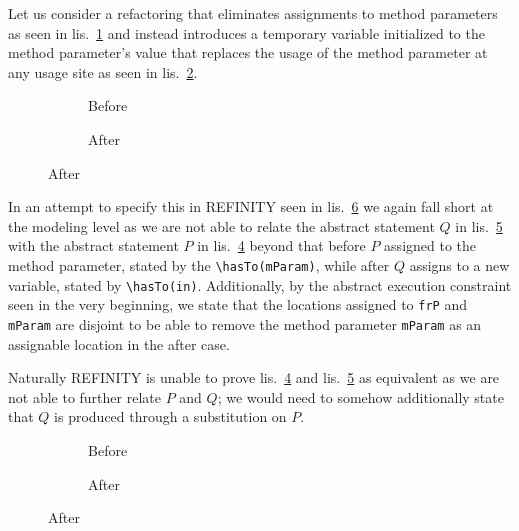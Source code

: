 Let us consider a refactoring that eliminates assignments to method parameters as seen in lis.~\ref{lst:RemoveAssignment-java-before} and instead introduces a temporary variable initialized to the method parameter's value that replaces the usage of the method parameter at any usage site as seen in lis.~\ref{lst:RemoveAssignment-java-after}.

\begin{figure}
  \begin{subfigure}{.45\linewidth}
    
    \caption{Before}
    \label{lst:RemoveAssignment-java-before}
  \end{subfigure}\hspace{1cm}
  \begin{subfigure}{.45\linewidth}
    
    \caption{After}
    \label{lst:RemoveAssignment-java-after}
  \end{subfigure}
  \label{lst:RemovAssignment-java}
\end{figure}

In an attempt to specify this in REFINITY seen in lis.~\ref{lst:RemovAssignment-refinity} we again fall short at the modeling level as we are not able to relate the abstract statement $Q$ in lis.~\ref{lst:RemoveAssignment-refinity-after} with the abstract statement $P$ in lis.~\ref{lst:RemoveAssignment-refinity-before} beyond that before $P$ assigned to the method parameter, stated by the \lstinline[style=refinity]|\hasTo(mParam)|, while after $Q$ assigns to a new variable, stated by \lstinline[style=refinity]|\hasTo(in)|. Additionally, by the abstract execution constraint seen in the very beginning, we state that the locations
assigned to \lstinline[style=refinity]|frP| and \lstinline[style=refinity]|mParam| are disjoint to be able to remove the method parameter \lstinline[style=refinity]|mParam| as an assignable location in the after case.

Naturally REFINITY is unable to prove lis.~\ref{lst:RemoveAssignment-refinity-before} and lis.~\ref{lst:RemoveAssignment-refinity-after} as equivalent
as we are not able to further relate $P$ and $Q$; we would need to somehow additionally state that $Q$ is produced through a substitution on $P$.

\begin{figure}
  \begin{subfigure}{.45\linewidth}
    
    \caption{Before}
    \label{lst:RemoveAssignment-refinity-before}
  \end{subfigure}\hspace{1cm}
  \begin{subfigure}{.45\linewidth}
    
    \caption{After}
    \label{lst:RemoveAssignment-refinity-after}
  \end{subfigure}
  \label{lst:RemovAssignment-refinity}
\end{figure}
